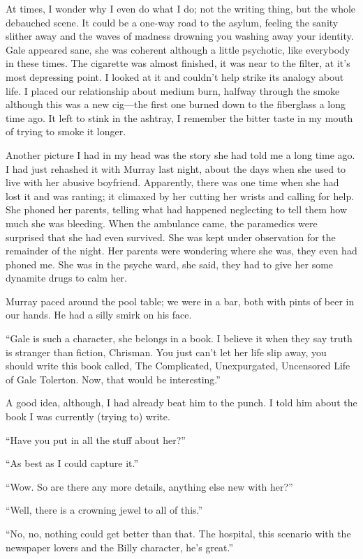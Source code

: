 At times, I wonder why I even do what I do; not the writing thing, but
the whole debauched scene. It could be a one-way road to the asylum,
feeling the sanity slither away and the waves of madness drowning you
washing away your identity. Gale appeared sane, she was coherent
although a little psychotic, like everybody in these times. The
cigarette was almost finished, it was near to the filter, at it's most
depressing point. I looked at it and couldn't help strike its analogy
about life. I placed our relationship about medium burn, halfway through
the smoke although this was a new cig---the first one burned down to the
fiberglass a long time ago. It left to stink in the ashtray, I remember
the bitter taste in my mouth of trying to smoke it longer.

Another picture I had in my head was the story she had told me a long
time ago. I had just rehashed it with Murray last night, about the days
when she used to live with her abusive boyfriend. Apparently, there was
one time when she had lost it and was ranting; it climaxed by her
cutting her wrists and calling for help. She phoned her parents, telling
what had happened neglecting to tell them how much she was bleeding.
When the ambulance came, the paramedics were surprised that she had even
survived. She was kept under observation for the remainder of the night.
Her parents were wondering where she was, they even had phoned me. She
was in the psyche ward, she said, they had to give her some dynamite
drugs to calm her.

Murray paced around the pool table; we were in a bar, both with pints of
beer in our hands. He had a silly smirk on his face.

``Gale is such a character, she belongs in a book. I believe it when
they say truth is stranger than fiction, Chrisman. You just can't let
her life slip away, you should write this book called, The Complicated,
Unexpurgated, Uncensored Life of Gale Tolerton. Now, that would be
interesting.''

A good idea, although, I had already beat him to the punch. I told him
about the book I was currently (trying to) write.

``Have you put in all the stuff about her?''

``As best as I could capture it.''

``Wow. So are there any more details, anything else new with her?''

``Well, there is a crowning jewel to all of this.''

``No, no, nothing could get better than that. The hospital, this
scenario with the newspaper lovers and the Billy character, he's
great.''

